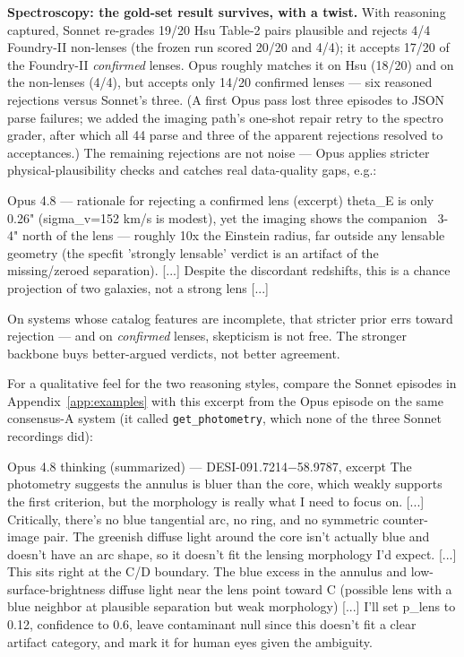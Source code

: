 \documentclass[11pt,letterpaper]{article}
\newcommand{\spectroHsu}{20/20}      %
\newcommand{\spectroNon}{4/4}        %
\newcommand{\rsSpecHsu}{19/20}\newcommand{\rsSpecNon}{4/4}\newcommand{\rsSpecConf}{17/20}
\newcommand{\roSpecHsu}{18/20}\newcommand{\roSpecNon}{4/4}\newcommand{\roSpecConf}{14/20}
\begin{document}
\textbf{Spectroscopy: the gold-set result survives, with a twist.} With reasoning
captured, Sonnet re-grades \rsSpecHsu{} Hsu Table-2 pairs plausible and rejects
\rsSpecNon{} Foundry-II non-lenses (the frozen run scored \spectroHsu{} and
\spectroNon); it accepts \rsSpecConf{} of the Foundry-II \emph{confirmed} lenses.
Opus roughly matches it on Hsu (\roSpecHsu) and on the non-lenses (\roSpecNon),
but accepts only \roSpecConf{} confirmed lenses --- six reasoned rejections versus
Sonnet's three. (A first Opus pass lost three episodes to JSON parse failures; we
added the imaging path's one-shot repair retry to the spectro grader, after which
all 44 parse and three of the apparent rejections resolved to acceptances.) The
remaining rejections are not noise --- Opus applies stricter physical-plausibility
checks and catches real data-quality gaps, e.g.:

\begin{toolio}{Opus 4.8 --- rationale for rejecting a confirmed lens (excerpt)}
theta_E is only 0.26" (sigma_v=152 km/s is modest), yet the imaging shows the companion ~3-4" north of the lens — roughly 10x the Einstein radius, far outside any lensable geometry (the specfit 'strongly lensable' verdict is an artifact of the missing/zeroed separation). [...] Despite the discordant redshifts, this is a chance projection of two galaxies, not a strong lens [...]
\end{toolio}

\noindent On systems whose catalog features are incomplete, that stricter prior
errs toward rejection --- and on \emph{confirmed} lenses, skepticism is not free.
The stronger backbone buys better-argued verdicts, not better agreement.

For a qualitative feel for the two reasoning styles, compare the Sonnet episodes in
Appendix~\ref{app:examples} with this excerpt from the Opus episode on the same
consensus-A system (it called \texttt{get\_photometry}, which none of the three
Sonnet recordings did):

\begin{toolio}{Opus 4.8 thinking (summarized) --- DESI-091.7214$-$58.9787, excerpt}
The photometry suggests the annulus is bluer than the core, which weakly supports the first criterion, but the morphology is really what I need to focus on. [...] Critically, there's no blue tangential arc, no ring, and no symmetric counter-image pair. The greenish diffuse light around the core isn't actually blue and doesn't have an arc shape, so it doesn't fit the lensing morphology I'd expect.
[...] This sits right at the C/D boundary. The blue excess in the annulus and low-surface-brightness diffuse light near the lens point toward C (possible lens with a blue neighbor at plausible separation but weak morphology) [...] I'll set p_lens to 0.12, confidence to 0.6, leave contaminant null since this doesn't fit a clear artifact category, and mark it for human eyes given the ambiguity.
\end{toolio}
\end{document}
